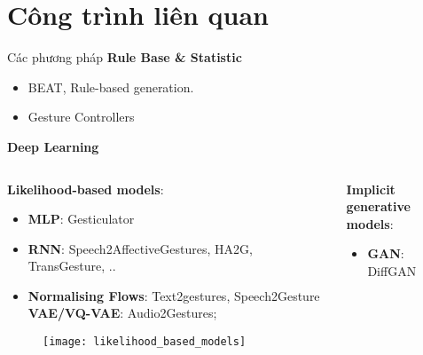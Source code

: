 \section{Công trình liên quan}

\begin{frame}{Các phương pháp}
\textbf{Rule Base \& Statistic}
\begin{itemize}
	\small
	\item BEAT, Rule-based generation.
	\item Gesture Controllers 
\end{itemize}

\textbf{Deep Learning}
\begin{columns}
	\begin{column}{0.5\textwidth}
			{
			\small
			\textbf{Likelihood-based models}:
			\begin{itemize}
				\item \textbf{MLP}: Gesticulator
				\item \textbf{RNN}: Speech2AffectiveGestures, HA2G, TransGesture, .. 
				\item \textbf{Normalising Flows}: Text2gestures, Speech2Gesture
				\textbf{VAE/VQ-VAE}:  Audio2Gestures; 
				\end{itemize}
			}
			 \begin{figure}
				\texttt{[image: likelihood\_based\_models]}
			\end{figure}
	\end{column}
	\hspace{-20pt}
	\begin{column}{0.5\textwidth}
		{
			\small
			\textbf{Implicit generative models}:
\begin{itemize}
			\item \textbf{GAN}: DiffGAN
			

\end{itemize}}
\end{column}
\end{columns}
\end{frame}
